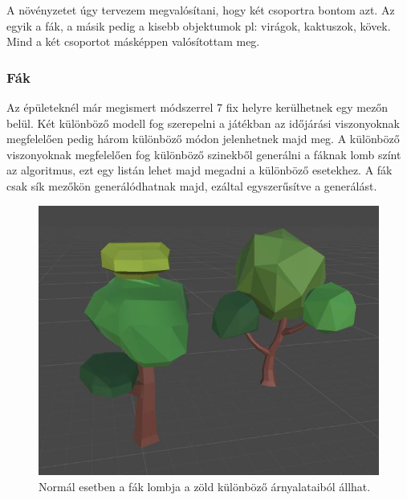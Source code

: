 A növényzetet úgy tervezem megvalósítani, hogy két csoportra bontom azt. Az egyik a fák, a másik pedig a kisebb objektumok pl: virágok, kaktuszok, kövek.  Mind a két csoportot másképpen valósítottam meg.

\subsubsection{Fák}

Az épületeknél már megismert módszerrel 7 fix helyre kerülhetnek egy mezőn belül. Két különböző modell fog szerepelni a játékban az időjárási viszonyoknak megfelelően pedig három különböző módon jelenhetnek majd meg. A különböző viszonyoknak megfelelően fog különböző szinekből generálni a fáknak lomb színt az algoritmus, ezt egy listán lehet majd megadni a különböző esetekhez. A fák csak sík mezőkön generálódhatnak majd, ezáltal egyszerűsítve a generálást.

\begin{figure}[h!]
\centering
\includegraphics[scale=0.32]{kepek/Tree_Normal.JPG}
\caption[normal]{Normál esetben a fák lombja a zöld különböző árnyalataiból állhat. \footnotemark}
\label{fig:Tree_Normal}
\end{figure}


